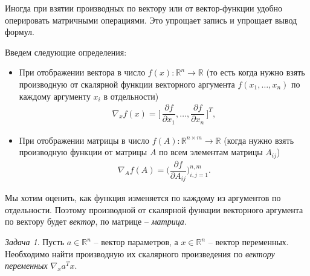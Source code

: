 \documentclass[%
	11pt,
	a4paper,
	utf8,
		]{article}
\begin{document}
Иногда при взятии производных по вектору или от вектор-функции удобно оперировать матричными операциями. Это упрощает запись и упрощает вывод формул.

Введем следующие определения:
\begin{itemize}
	\item При отображении вектора в число $ f(x): \mathbb{R}^n \rightarrow \mathbb{R} $ (то есть когда нужно взять производную от скалярной функции векторного аргумента $ f(x_1, \ldots, x_n) $ по каждому аргументу $ x_i $ в отдельности)
\begin{align*}
	\nabla_x f(x) = \Big[ \, \dfrac{ \partial f }{\partial x_1}, \ldots, \dfrac{ \partial f }{ \partial x_n } \, \Big]^T,
\end{align*}

    \item При отображении матрицы в число $ f(A): \mathbb{R}^{n \times m} \rightarrow \mathbb{R} $ (когда нужно взять производную функции от матрицы $ A $ по всем элементам матрицы $ A_{ij} $)
\begin{align*}
	\nabla_A f(A) = \Big( \dfrac{ \partial f }{ \partial A_{ij} } \Big)_{i, j = 1}^{n, m}.
\end{align*}
\end{itemize}

Мы хотим оценить, как функция изменяется по каждому из аргументов по отдельности. Поэтому производной от скалярной функции векторного аргумента по вектору будет \emph{вектор}, по матрице -- \emph{матрица}.


\emph{Задача 1}. Пусть $ a \in \mathbb{R}^n $ -- вектор параметров, а $ x \in \mathbb{R}^n $ -- вектор переменных. Необходимо найти производную их скалярного произведения по \emph{вектору переменных} $ \nabla_x a^T x $.
\end{document}
